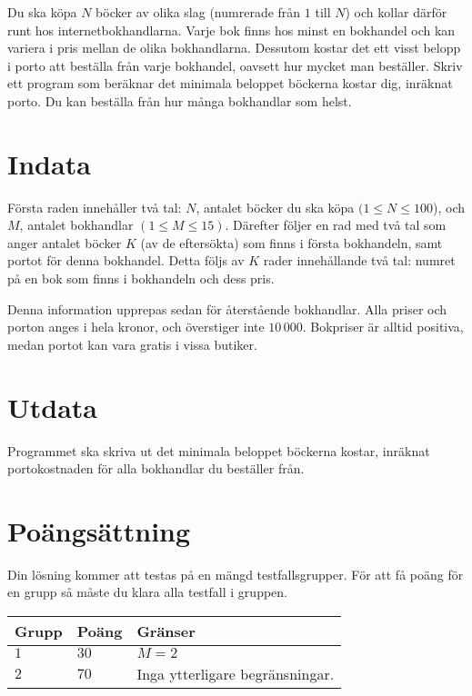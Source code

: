 Du ska köpa $N$ böcker av olika slag (numrerade från $1$ till $N$) och kollar därför runt hos internetbokhandlarna.
Varje bok finns hos minst en bokhandel och kan variera i pris mellan de olika bokhandlarna.
Dessutom kostar det ett visst belopp i porto att beställa från varje bokhandel, oavsett hur mycket man beställer.
Skriv ett program som beräknar det minimala beloppet böckerna kostar dig, inräknat porto.
Du kan beställa från hur många bokhandlar som helst.

\section*{Indata}
Första raden innehåller två tal: $N$, antalet böcker du ska köpa $(1 \le N \le 100$), och $M$, antalet bokhandlar $(1 \le M \le 15)$.
Därefter följer en rad med två tal som anger antalet böcker $K$ (av de eftersökta) som finns i första bokhandeln, samt portot för denna bokhandel.
Detta följs av $K$ rader innehållande två tal: numret på en bok som finns i bokhandeln och dess pris.

Denna information upprepas sedan för återstående bokhandlar.
Alla priser och porton anges i hela kronor, och överstiger inte $10\,000$.
Bokpriser är alltid positiva, medan portot kan vara gratis i vissa butiker.

\section*{Utdata}
Programmet ska skriva ut det minimala beloppet böckerna kostar, inräknat portokostnaden för alla bokhandlar du beställer från.

\section*{Poängsättning}
Din lösning kommer att testas på en mängd testfallsgrupper.
För att få poäng för en grupp så måste du klara alla testfall i gruppen.

\noindent
\begin{tabular}{| l | l | p{12cm} |}
  \hline
  \textbf{Grupp} & \textbf{Poäng} & \textbf{Gränser} \\ \hline
  $1$    & $30$       & $M=2$ \\ \hline
  $2$    & $70$       & Inga ytterligare begränsningar. \\ \hline
\end{tabular}
